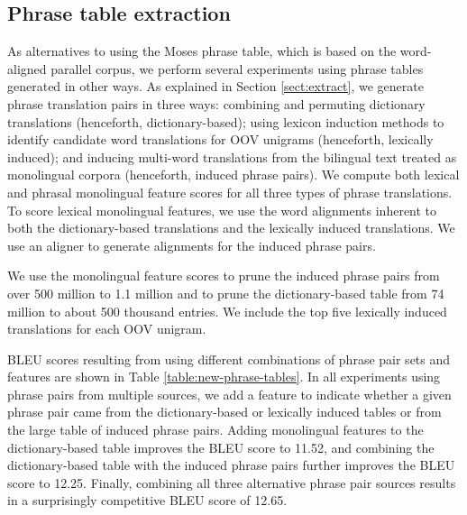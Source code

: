 \documentclass[11pt]{article}
\newcommand{\mnote}[1]{\marginpar{%
  \vskip-\baselineskip
  \raggedright\footnotesize
  \itshape\hrule\smallskip\tiny{#1}\par\smallskip\hrule}}
\newcommand{\mtodo}[1]{\mnote{\textcolor{red}{#1}}}
\begin{document}

\subsection{Phrase table extraction}\label{sect:exp:pt}
As alternatives to using the Moses phrase table, which is based on the word-aligned parallel corpus, we perform several experiments using phrase tables generated in other ways. As explained in Section \ref{sect:extract}, we generate phrase translation pairs in three ways: combining and permuting dictionary translations (henceforth, dictionary-based); using lexicon induction methods to identify candidate word translations for OOV unigrams (henceforth, lexically induced); and inducing multi-word translations from the bilingual text treated as monolingual corpora (henceforth, induced phrase pairs). We compute both lexical and phrasal monolingual feature scores for all three types of phrase translations. To score lexical monolingual features, we use the word alignments inherent to both the dictionary-based translations and the lexically induced translations. We use an aligner \cite{DeNero07} to generate alignments for the induced phrase pairs. 

We use the monolingual feature scores to prune the induced phrase pairs from over 500 million to 1.1 million and to prune the dictionary-based table from 74 million to about 500 thousand entries. We include the top five lexically induced translations for each OOV unigram.

BLEU scores resulting from using different combinations of phrase pair sets and features are shown in Table \ref{table:new-phrase-tables}. In all experiments using phrase pairs from multiple sources, we add a feature to indicate whether a given phrase pair came from the dictionary-based or lexically induced tables or from the large table of induced phrase pairs.
Adding monolingual features to the dictionary-based table improves the BLEU score to 
11.52, and combining the dictionary-based table with the induced phrase pairs further improves the BLEU score to 12.25. Finally, combining all three alternative phrase pair sources results in a surprisingly competitive BLEU score of 12.65\mtodo{get final score with tuning, and with other lower frequency terms}. 
\end{document}
